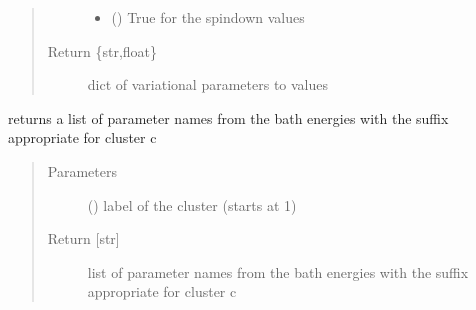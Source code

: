 \documentclass[letterpaper,10pt,english]{sphinxmanual}
\begin{document}
\begin{fulllineitems}
\begin{fulllineitems}
\begin{quote}
\begin{description}
\begin{itemize}
\item {} 
\sphinxAtStartPar
{} () \textendash{} True for the spin\sphinxhyphen{}down values

\end{itemize}

\item[{Return \{str,float\}}] \leavevmode
\sphinxAtStartPar
dict of variational parameters to values

\end{description}\end{quote}

\end{fulllineitems}


\begin{fulllineitems}
\label{\detokenize{cdmft:pyqcm.cdmft.general_bath.varia_E}}
\sphinxAtStartPar
returns a list of parameter names from the bath energies with the suffix appropriate for cluster c
\begin{quote}\begin{description}
\item[{Parameters}] \leavevmode
\sphinxAtStartPar
{} () \textendash{} label of the cluster (starts at 1)

\item[{Return {[}str{]}}] \leavevmode
\sphinxAtStartPar
list of parameter names from the bath energies with the suffix appropriate for cluster c

\end{description}\end{quote}

\end{fulllineitems}



\end{fulllineitems}
\end{document}

